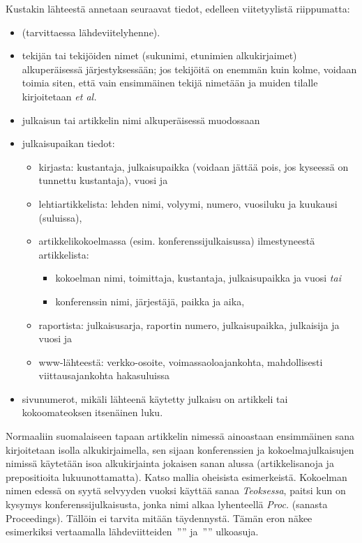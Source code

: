 Kustakin lähteestä annetaan seuraavat tiedot, edelleen viitetyylistä riippumatta:
\begin{itemize}
\item (tarvittaessa lähdeviitelyhenne).
\item
tekijän tai tekijöiden nimet (sukunimi, etunimien alkukirjaimet)
alkuperäisessä järjestyksessään; jos tekijöitä on enemmän kuin kolme,
voidaan toimia siten, että
vain ensimmäinen tekijä nimetään ja muiden tilalle kirjoitetaan {\em et
al.}
\item
julkaisun tai artikkelin nimi alkuperäisessä muodossaan
\item
julkaisupaikan tiedot:
\begin{itemize}
\item
kirjasta: kustantaja, julkaisupaikka (voidaan jättää pois, jos kyseessä
on tunnettu kustantaja), vuosi ja
\item
lehtiartikkelista: lehden nimi, volyymi, numero, vuosiluku ja kuukausi (suluissa),

\item
artikkelikokoelmassa (esim. konferenssijulkaisussa) ilmestyneestä
artikkelista:
\begin{itemize}
\item kokoelman nimi, toimittaja, kustantaja, julkaisupaikka ja vuosi
{\em tai}
\item konferenssin nimi, järjestäjä, paikka ja aika,
\end{itemize}
\item
raportista: julkaisusarja, raportin numero, julkaisupaikka, julkaisija ja vuosi
ja
\item
www-lähteestä: verkko-osoite, voimassaoloajankohta, mahdollisesti
viittausajankohta hakasuluissa
\end{itemize}
\item
sivunumerot, mikäli lähteenä käytetty julkaisu on artikkeli tai kokoomateoksen itsenäinen luku.
\end{itemize}

Normaaliin suomalaiseen tapaan artikkelin nimessä ainoastaan
ensimmäinen sana kirjoitetaan isolla alkukirjaimella, sen sijaan
konferenssien ja kokoelmajulkaisujen nimissä käytetään isoa
alkukirjainta jokaisen sanan alussa (artikkelisanoja ja prepositioita
lukuunottamatta). Katso mallia oheisista esimerkeistä.
Kokoelman nimen edessä on syytä selvyyden vuoksi käyttää sanaa {\em
Teoksessa}, paitsi kun on kysymys konferenssijulkaisusta, jonka nimi
alkaa lyhenteellä {\em Proc.} (sanasta Proceedings). Tällöin ei tarvita
mitään täydennystä.
Tämän eron näkee esimerkiksi vertaamalla
lähdeviitteiden~''\citep{dantowsley90}''
ja~''\citep{gannonetal89}'' ulkoasuja.

